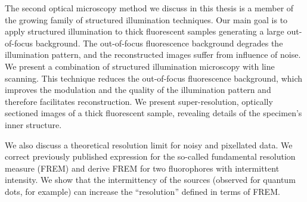 The second optical microscopy method we discuss in this thesis is a member of the growing family of structured illumination techniques. Our main goal is to apply structured illumination to thick fluorescent samples generating a large out-of-focus background. The out-of-focus fluorescence background degrades the illumination pattern, and the reconstructed images suffer from influence of noise. We present a combination of structured illumination microscopy with line scanning. This technique reduces the out-of-focus fluorescence background, which improves the modulation and the quality of the illumination pattern and therefore facilitates reconstruction. We present super-resolution, optically sectioned images of a thick fluorescent sample, revealing details of the specimen's inner structure. 

We also discuss a theoretical resolution limit for noisy and pixellated data. We correct previously published expression for the so-called fundamental resolution measure (FREM) and derive FREM for two fluorophores with intermittent intensity. We show that the intermittency of the sources (observed for quantum dots, for example) can increase the ``resolution'' defined in terms of FREM.
%  